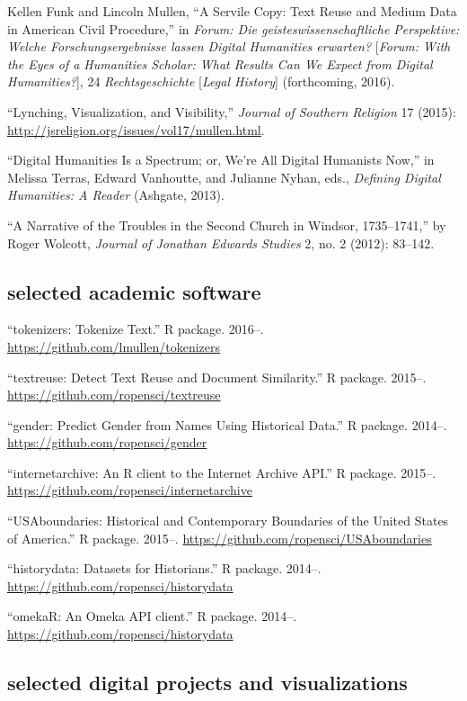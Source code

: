 \documentclass[11pt]{article}
\begin{document}
Kellen Funk and Lincoln Mullen, ``A Servile Copy: Text Reuse and Medium Data 
in American Civil Procedure,'' in \emph{Forum: Die geisteswissenschaftliche 
  Perspektive: Welche Forschungsergebnisse lassen Digital Humanities 
  erwarten?} [\emph{Forum: With the Eyes of a Humanities Scholar: What Results 
  Can We Expect from Digital Humanities?}], 24 \emph{Rechtsgeschichte} 
[\emph{Legal History}] (forthcoming, 2016).

``Lynching, Visualization, and Visibility,'' \emph{Journal of Southern 
  Religion} 17 (2015): \url{http://jsreligion.org/issues/vol17/mullen.html}.

``Digital Humanities Is a Spectrum; or, We're All Digital Humanists
Now,'' in Melissa Terras, Edward Vanhoutte, and Julianne Nyhan, eds.,
\emph{Defining Digital Humanities: A Reader} (Ashgate, 2013).

``A Narrative of the Troubles in the Second Church in Windsor,
1735--1741,'' by Roger Wolcott, \emph{Journal of Jonathan Edwards
  Studies} 2, no. 2 (2012): 83--142.

\subsection{selected academic software}\label{academic-software}

``tokenizers: Tokenize Text.'' R package. 2016--. 
\url{https://github.com/lmullen/tokenizers}

``textreuse: Detect Text Reuse and Document Similarity.'' R package. 2015--. 
\url{https://github.com/ropensci/textreuse}

``gender: Predict Gender from Names Using Historical Data.'' R package. 
2014--. \url{https://github.com/ropensci/gender}

``internetarchive: An R client to the Internet Archive API.'' R package.  
2015--. \url{https://github.com/ropensci/internetarchive}

``USAboundaries: Historical and Contemporary Boundaries of the United States 
of America.'' R package.  2015--.  
\url{https://github.com/ropensci/USAboundaries}

``historydata: Datasets for Historians.'' R package. 2014--.  
\url{https://github.com/ropensci/historydata}

``omekaR: An Omeka API client.'' R package. 2014--. 
\url{https://github.com/ropensci/historydata}

\subsection{selected digital projects and visualizations}\label{digital-projects}
\end{document}
